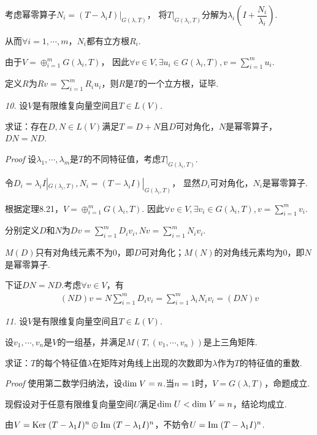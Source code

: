 考虑幂零算子\(N_i=(T-\lambda_i I)|_{G(\lambda,T)}\)，
将\(T|_{G(\lambda_i,T)}\)分解为\(\lambda_i(I+\dfrac{N_i}{\lambda_i})\).

从而\(\forall i=1,\cdots,m\)，\(N_i\)都有立方根\(R_i\).

由于\(V=\oplus_{i=1}^m G(\lambda_i,T)\)，
因此\(\forall v \in V,\exists u_i \in G(\lambda_i,T),v=\sum_{i=1}^m u_i\).

定义\(R\)为\(Rv=\sum_{i=1}^m R_iu_i\)，则\(R\)是\(T\)的一个立方根，证毕.

\newpage

\textit{10.}
设\(V\)是有限维复向量空间且\(T \in L(V)\).

求证：存在\(D,N \in L(V)\)满足\(T=D+N\)且\(D\)可对角化，\(N\)是幂零算子，\(DN=ND\).

\textit{Proof}
设\(\lambda_1,\cdots,\lambda_m\)是\(T\)的不同特征值，考虑\(T|_{G(\lambda_i,T)}\).

令\(D_i=\lambda_i I|_{G(\lambda_i,T)},N_i=(T-\lambda_i I)|_{G(\lambda_i,T)}\)，
显然\(D_i\)可对角化，\(N_i\)是幂零算子.

根据定理8.21，\(V=\oplus_{i=1}^m G(\lambda_i,T)\).
因此\(\forall v \in V,\exists v_i \in G(\lambda_i,T),v=\sum_{i=1}^m v_i\).

分别定义\(D\)和\(N\)为\(Dv=\sum_{i=1}^m D_iv_i,Nv=\sum_{i=1}^m N_iv_i\).

\(M(D)\)只有对角线元素不为\(0\)，即\(D\)可对角化；\(M(N)\)的对角线元素均为\(0\)，即\(N\)是幂零算子.

下证\(DN=ND\).考虑\(\forall v \in V\)，有
    \begin{align*}
        (ND)v=N\sum_{i=1}^m D_iv_i=\sum_{i=1}^m \lambda_iN_iv_i=(DN)v
    \end{align*}

\hspace*{\fill}

\textit{11.}
设\(V\)是有限维复向量空间且\(T \in L(V)\).

设\(v_1,\cdots,v_n\)是\(V\)的一组基，并满足\(M(T,(v_1,\cdots,v_n))\)是上三角矩阵.

求证：\(T\)的每个特征值\(\lambda\)在矩阵对角线上出现的次数即为\(\lambda\)作为\(T\)的特征值的重数.

\textit{Proof}
使用第二数学归纳法，设\(\mathrm{dim \;} V=n\).当\(n=1\)时，\(V=G(\lambda,T)\)，命题成立.

现假设对于任意有限维复向量空间\(U\)满足\(\mathrm{dim \;} U<\mathrm{dim \;} V=n\)，结论均成立.

由\(V=\mathrm{Ker \;} (T-\lambda_1 I)^n \oplus \mathrm{Im \;} (T-\lambda_1 I)^n\)，不妨令\(U=\mathrm{Im \;} (T-\lambda_1 I)^n\).

